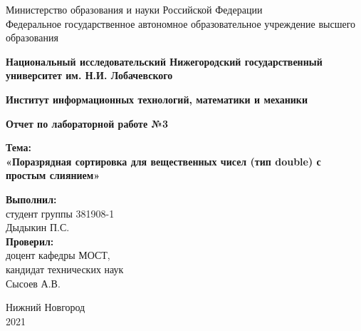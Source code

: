 \documentclass[12pt]{report}
\begin{document}
\begin{titlepage}
\begin{center}
    Министерство образования и науки Российской Федерации \\
    Федеральное государственное автономное образовательное учреждение высшего образования
\end{center}
\begin{center}
    \textbf{Национальный исследовательский Нижегородский государственный университет им. Н.И. Лобачевского} \\
\end{center}
\begin{center}
    \textbf{Институт информационных технологий, математики и механики}\\
\end{center}

\vspace{4em}

\begin{center}
    \textbf{\Large Отчет по лабораторной работе №3} \\
\end{center}

\begin{center}
    \textbf{Тема:} \\
    \textbf{\Large «Поразрядная сортировка для вещественных чисел (тип double) с простым слиянием»}
\end{center}

\vspace{4em}

\begin{flushright}
\begin{minipage}{0.55\textwidth}
\begin{flushleft}

\textbf{Выполнил:} \\
студент группы 381908-1 \\
Дыдыкин П.С. \\

\textbf{Проверил:} \\
доцент кафедры МОСТ, \\
кандидат технических наук \\
Сысоев А.В. \\
\end{flushleft}
\end{minipage}
\end{flushright}


\vspace{\fill}

\begin{center}
Нижний Новгород \\
2021
\end{center}

\end{titlepage}
\end{document}
